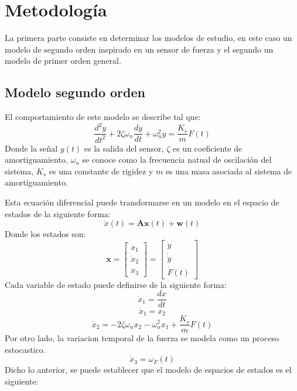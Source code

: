 \documentclass[conference]{IEEEtran}
\begin{document}
\section{Metodolog\'ia}


La primera parte consiste en determinar los modelos de estudio, en este caso un modelo de segundo orden inspirado en un sensor de fuerza y el segundo un modelo de primer orden general.

\subsection{Modelo segundo orden}


El comportamiento de este modelo se describe tal que:
\begin{equation}
	\frac{d^2y}{dt^2} + 2\zeta\omega_n \frac{dy}{dt} + \omega_n^2 y = \frac{K_s}{m} F(t)
\end{equation}
Donde la se\~nal $y(t)$ es la salida del sensor, $\zeta$ es un coeficiente de amortiguamiento, $\omega_n$ se conoce como la frecuencia natual de oscilaci\'on del sistema, ${K_s}$ es una constante de rigidez y $m$ es una masa asociada al sistema de amortiguamiento.

Esta ecuaci\'on diferencial puede transformarse en un modelo en el espacio de estados de la siguiente forma:
\[
\dot{x}(t) = \mathbf{A}\mathbf{x}(t) + \mathbf{w}(t)
\]
Donde los estados son:
\[
	\mathbf{x} = 
	\begin{bmatrix}
	\dot{x}_1 \\
	\dot{x}_2 \\
	\dot{x}_3
	\end{bmatrix} =
	\begin{bmatrix}
		\dot{y} \\
		\dot\dot{y} \\
		\dot{F}(t)
	\end{bmatrix}
\]
Cada variable de estado puede definirse de la siguiente forma:
\[
	\dot{x}_1 = \frac{ dx}{dt}
\]
\[
	\dot{x}_1 = x_2
\]
\[
	\dot{x}_2 = -2\zeta\omega_n x_2 - \omega_n^2x_1 + \frac{K_s}{m}F(t)
\]
Por otro lado, la variacion temporal de la fuerza se modela como un proceso estocastico.
\[
	\dot{x}_3 =  \omega_{F}(t)
\]
Dicho lo anterior, se puede establecer que el modelo de espacios de estados es el siguiente:
\end{document}
